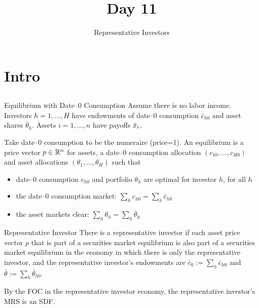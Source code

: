 \documentclass[xcolor=dvipsnames,10pt]{beamer}
\title{\vskip 0.5in Day 11}
\subtitle{Representative Investors}
\begin{document}
\begin{frame}[plain]
  \titlepage
\end{frame}

\section{Intro}\subsection{}

\begin{frame}{Equilibrium with Date--0 Consumption}
Assume there is no labor income.
Investors $h=1,\ldots,H$ have endowments of date--0 consumption $\bar{c}_{h0}$ and asset shares $\bar{\theta}_h$.  Assets $i=1,\ldots,n$ have payoffs $\tilde{x}_i$.

Take date--0 consumption to be the numeraire (price=1).  An equilibrium is a price vector $p\in \mathbb{R}^n$ for assets, a date--0 consumption allocation $(c_{10},\ldots,c_{H0})$ and asset allocations $(\theta_1,\ldots,\theta_H)$ such that
\begin{itemize}
    \item date--0 consumption $c_{h0}$ and portfolio $\theta_h$ are optimal for investor $h$, for all $h$
    \item the date--0 consumption market: $\sum_h c_{h0} = \sum_h \bar{c}_{h0}$
    \item the asset markets clear: $\sum_h \theta_h = \sum_h\bar{\theta}_h$
\end{itemize}
\end{frame}

\begin{frame}{Representative Investor}
    There is a representative investor 
    if each asset price vector $p$ that is part of a securities market equilibrium is also part of a securities market equilibrium in the economy in which there is only the representative investor, and the representative investor's endowments are $\bar{c}_0 := \sum_h \bar{c}_{h0}$ and $\bar{\theta} := \sum_h \bar{\theta}_{h0}$.  
    
    By the FOC in the representative investor economy, the representative investor's MRS is an SDF.
 \end{frame}
 
\end{document}
